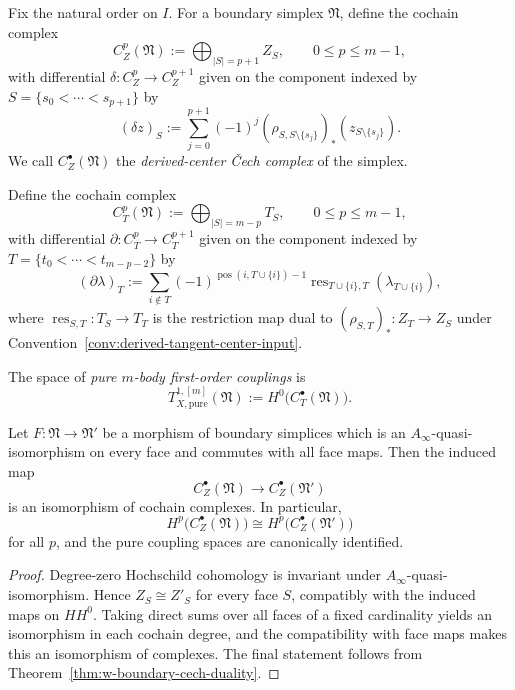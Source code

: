 \begin{definition}
\label{def:w-derived-center-cech}
Fix the natural order on $I$. For a boundary simplex $\mathfrak N$, define the cochain complex
\[
C_Z^p(\mathfrak N):=\bigoplus_{|S|=p+1} Z_S,
\qquad 0\le p\le m-1,
\]
with differential $\delta\colon C_Z^p\to C_Z^{p+1}$ given on the component indexed by
$S=\{s_0<\cdots<s_{p+1}\}$ by
\[
(\delta z)_S
:=
\sum_{j=0}^{p+1}(-1)^j (\rho_{S,S\setminus\{s_j\}})_*(z_{S\setminus\{s_j\}}).
\]
We call $C_Z^\bullet(\mathfrak N)$ the \emph{derived-center \v{C}ech complex} of the simplex.
\end{definition}

\begin{definition}
\label{def:w-tangent-restriction-complex}
Define the cochain complex
\[
C_T^p(\mathfrak N):=\bigoplus_{|S|=m-p} T_S,
\qquad 0\le p\le m-1,
\]
with differential $\partial\colon C_T^p\to C_T^{p+1}$ given on the component indexed by
$T=\{t_0<\cdots<t_{m-p-2}\}$ by
\[
(\partial\lambda)_T
:=
\sum_{i\notin T}(-1)^{\operatorname{pos}(i,T\cup\{i\})-1}
\operatorname{res}_{T\cup\{i\},T}(\lambda_{T\cup\{i\}}),
\]
where $\operatorname{res}_{S,T}\colon T_S\to T_T$ is the restriction map dual to
$(\rho_{S,T})_*\colon Z_T\to Z_S$ under Convention~\ref{conv:derived-tangent-center-input}.

The space of \emph{pure $m$-body first-order couplings} is
\[
T^{1,[m]}_{X,\mathrm{pure}}(\mathfrak N):=H^0\bigl(C_T^\bullet(\mathfrak N)\bigr).
\]
\end{definition}

\begin{lemma}
\label{lem:w-boundary-simplex-homotopy-invariance}
Let $F\colon \mathfrak N\to \mathfrak N'$ be a morphism of boundary simplices which is an
$A_\infty$-quasi-isomorphism on every face and commutes with all face maps. Then the induced map
\[
C_Z^\bullet(\mathfrak N)\longrightarrow C_Z^\bullet(\mathfrak N')
\]
is an isomorphism of cochain complexes. In particular,
\[
H^p\bigl(C_Z^\bullet(\mathfrak N)\bigr)
\cong
H^p\bigl(C_Z^\bullet(\mathfrak N')\bigr)
\]
for all $p$, and the pure coupling spaces are canonically identified.
\end{lemma}

\begin{proof}
Degree-zero Hochschild cohomology is invariant under $A_\infty$-quasi-isomorphism. Hence
$Z_S\cong Z'_S$ for every face $S$, compatibly with the induced maps on $HH^0$. Taking direct sums over all faces of a fixed cardinality yields an isomorphism in each cochain degree, and the compatibility with face maps makes this an isomorphism of complexes. The final statement follows from Theorem~\ref{thm:w-boundary-cech-duality}.
\end{proof}

